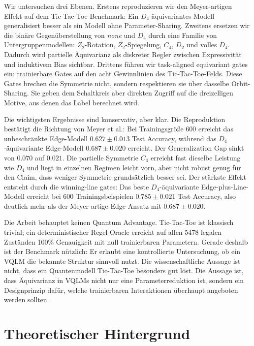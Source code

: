 Wir untersuchen drei Ebenen. Erstens reproduzieren wir den Meyer-artigen Effekt auf dem Tic-Tac-Toe-Benchmark: Ein $D_4$-äquivariantes Modell generalisiert besser als ein Modell ohne Parameter-Sharing. Zweitens ersetzen wir die binäre Gegenüberstellung von \emph{none} und $D_4$ durch eine Familie von Untergruppenmodellen: $Z_2$-Rotation, $Z_2$-Spiegelung, $C_4$, $D_2$ und volles $D_4$. Dadurch wird partielle Äquivarianz als diskreter Regler zwischen Expressivität und induktivem Bias sichtbar. Drittens führen wir task-aligned equivariant gates ein: trainierbare Gates auf den acht Gewinnlinien des Tic-Tac-Toe-Felds. Diese Gates brechen die Symmetrie nicht, sondern respektieren sie über dasselbe Orbit-Sharing. Sie geben dem Schaltkreis aber direkten Zugriff auf die dreizelligen Motive, aus denen das Label berechnet wird.

Die wichtigsten Ergebnisse sind konservativ, aber klar. Die Reproduktion bestätigt die Richtung von Meyer et al.: Bei Trainingsgröße 600 erreicht das unbeschränkte Edge-Modell $0.627\pm0.013$ Test Accuracy, während das $D_4$-äquivariante Edge-Modell $0.687\pm0.020$ erreicht. Der Generalization Gap sinkt von $0.070$ auf $0.021$. Die partielle Symmetrie $C_4$ erreicht fast dieselbe Leistung wie $D_4$ und liegt in einzelnen Regimen leicht vorn, aber nicht robust genug für den Claim, dass weniger Symmetrie grundsätzlich besser sei. Der stärkste Effekt entsteht durch die winning-line gates: Das beste $D_4$-äquivariante Edge-plus-Line-Modell erreicht bei 600 Trainingsbeispielen $0.785\pm0.021$ Test Accuracy, also deutlich mehr als der Meyer-artige Edge-Ansatz mit $0.687\pm0.020$.

Die Arbeit behauptet keinen Quantum Advantage. Tic-Tac-Toe ist klassisch trivial; ein deterministischer Regel-Oracle erreicht auf allen 5478 legalen Zuständen 100\% Genauigkeit mit null trainierbaren Parametern. Gerade deshalb ist der Benchmark nützlich: Er erlaubt eine kontrollierte Untersuchung, ob ein VQLM die bekannte Struktur sinnvoll nutzt. Die wissenschaftliche Aussage ist nicht, dass ein Quantenmodell Tic-Tac-Toe besonders gut löst. Die Aussage ist, dass Äquivarianz in VQLMs nicht nur eine Parameterreduktion ist, sondern ein Designprinzip dafür, welche trainierbaren Interaktionen überhaupt angeboten werden sollten.

\section{Theoretischer Hintergrund}\label{sec:theorie}

